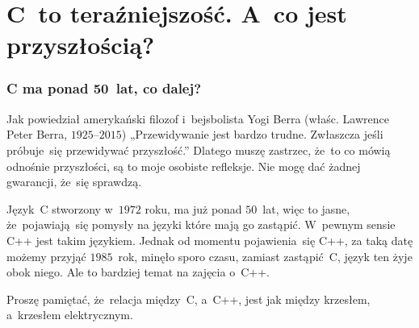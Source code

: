 \documentclass[10pt,t]{beamer}
\begin{document}










\section{C~to teraźniejszość. A~co jest przyszłością?}



\begin{frame}
  \frametitle{C ma ponad 50~lat, co dalej?}


  Jak powiedział amerykański filozof i~bejsbolista Yogi Berra
  (właśc. Lawrence Peter Berra, $1925 \text{--} 2015$) „Przewidywanie jest
  bardzo trudne. Zwłaszcza jeśli próbuje~się przewidywać przyszłość.”
  Dlatego muszę zastrzec, że~to co mówią odnośnie przyszłości, są to moje
  osobiste refleksje. Nie mogę dać żadnej gwarancji, że~się sprawdzą.

  Język~C stworzony w~$1972$ roku, ma już ponad $50$~lat, więc to jasne,
  że~pojawiają~się pomysły na języki które mają go zastąpić. W~pewnym sensie
  C++ jest takim językiem. Jednak od momentu pojawienia~się C++, za taką
  datę możemy przyjąć $1985$~rok, minęło sporo czasu, zamiast zastąpić~C,
  język ten żyje obok niego. Ale to bardziej temat na zajęcia o~C++.

  Proszę pamiętać, że~relacja między~C, a~C++, jest jak między krzesłem,
  a~krzesłem elektrycznym.

\end{frame}
\end{document}
